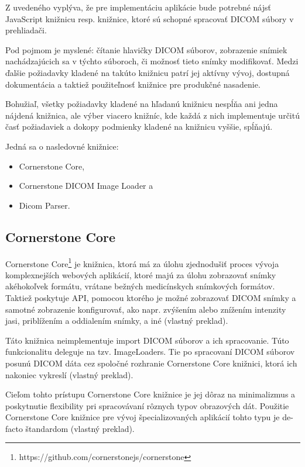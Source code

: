 Z uvedeného vyplýva, že pre implementáciu aplikácie bude potrebné nájsť JavaScript knižnicu resp. knižnice, ktoré sú schopné spracovať DICOM súbory v prehliadači.

Pod pojmom  je myslené: čítanie hlavičky DICOM súborov, zobrazenie snímiek nachádzajúcich sa v týchto súboroch, či možnosť tieto snímky modifikovať. Medzi ďalšie požiadavky kladené na takúto knižnicu patrí jej aktívny vývoj, dostupná dokumentácia a taktiež použiteľnosť knižnice pre produkčné nasadenie.

Bohužiaľ, všetky požiadavky kladené na hľadanú knižnicu nespĺňa ani jedna nájdená knižnica, ale výber viacero knižníc, kde každá z nich implementuje určitú časť požiadaviek a dokopy podmienky kladené na knižnicu vyššie, spĺňajú.

Jedná sa o nasledovné knižnice:
\begin {itemize}
\item {Cornerstone Core,}
\item {Cornerstone DICOM Image Loader a}
\item {Dicom Parser.}
\end {itemize}

\subsection {Cornerstone Core}
Cornerstone Core\footnote{https://github.com/cornerstonejs/cornerstone} je knižnica, ktorá má za úlohu zjednodušiť proces vývoja komplexnejších webových aplikácií, ktoré majú za úlohu zobrazovať snímky akéhokoľvek formátu, vrátane bežných medicínskych snímkových formátov. Taktiež poskytuje API, pomocou ktorého je možné zobrazovať DICOM snímky a samotné zobrazenie konfigurovať, ako napr. zvýšením alebo znížením intenzity jasi, priblížením a oddialením snímky, a iné \cite{about_cornerstone_core} (vlastný preklad).

Táto knižnica neimplementuje import DICOM súborov a ich spracovanie. Túto funkcionalitu deleguje na tzv. ImageLoaders. Tie po spracovaní DICOM súborov posunú DICOM dáta cez spoločné rozhranie Cornerstone Core knižnici, ktorá ich nakoniec vykreslí \cite{about_cornerstone_core} (vlastný preklad).

Cieľom tohto prístupu Cornerstone Core knižnice je jej dôraz na minimalizmus a poskytnutie flexibility pri spracovávaní rôznych typov obrazových dát. Použitie Cornerstone Core knižnice pre vývoj špecializovaných aplikácií tohto typu je de-facto štandardom \cite{about_cornerstone_core} (vlastný preklad).

